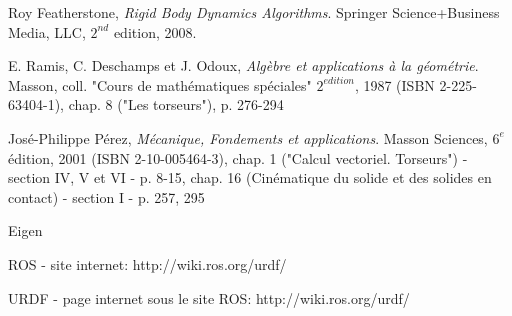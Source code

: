 
\begin{thebibliography}{9}

  Roy Featherstone,
  \emph{Rigid Body Dynamics Algorithms}.
  Springer Science+Business Media, LLC,
  $2^{nd}$ edition,
  2008.

  E. Ramis, C. Deschamps et J. Odoux,
  \emph{Algèbre et applications à la géométrie}.
  Masson, coll. "Cours de mathématiques spéciales"
  $2^{edition}$, 1987 (ISBN 2-225-63404-1),
  chap. 8 ("Les torseurs"), p. 276-294
  
  José-Philippe Pérez,
  \emph{Mécanique, Fondements et applications}.
  Masson Sciences,
  $6^{e}$ édition, 2001 (ISBN 2-10-005464-3),
  chap. 1 ("Calcul vectoriel. Torseurs") - section IV, V et VI - p. 8-15, 
  chap. 16 (Cinématique du solide et des solides en contact) - section I - p. 257, 295
  
  Eigen
  
  ROS - site internet:
  http://wiki.ros.org/urdf/

  URDF - page internet sous le site ROS:
  http://wiki.ros.org/urdf/


\end{thebibliography}

